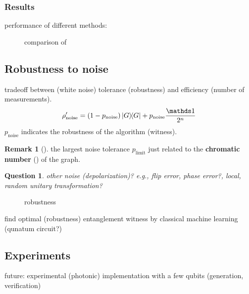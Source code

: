 \documentclass[
10pt,
aps,
pra,
linenumbers,
floatfix,
]{revtex4-2}
\theoremstyle{plain}
\newtheorem{question}{Question}
\theoremstyle{definition}
\newtheorem{remark}{Remark}
\newcommand{\noise}{\text{noise}}
\newcommand{\dm}{\rho}
\begin{document}
\subsubsection{Results}
performance of different methods: 
\begin{figure}[!ht]
	\centering
	\caption{comparison of }
\end{figure}

\subsection{Robustness to noise}
tradeoff between (white noise) tolerance (robustness) and efficiency (number of measurements).
\begin{equation}
	\dm_{\noise}' = (1-p_{\noise}) \op{G} + p_{\noise} \frac{\identity}{2^n}
\end{equation}
$p_{\noise}$ indicates the robustness of the algorithm (witness).
\begin{remark}[\cite{zhouDetectingMultipartiteEntanglement2019}]
	the largest noise tolerance $p_{\text{limit}}$ just related to the \textbf{chromatic number} () of the graph.
\end{remark}
\begin{question}
	other noise (depolarization)? e.g., flip error, phase error?, local, random unitary transformation?
\end{question}
\begin{figure}[!ht]
	\centering
	\caption{robustness }
\end{figure}
find optimal (robustness) entanglement witness by classical machine learning (qunatum circuit?)

% 
% 

\subsection{Experiments}
future: experimental (photonic) implementation with a few qubits (generation, verification) \cite{luEntanglementStructureEntanglement2018}
\end{document}
